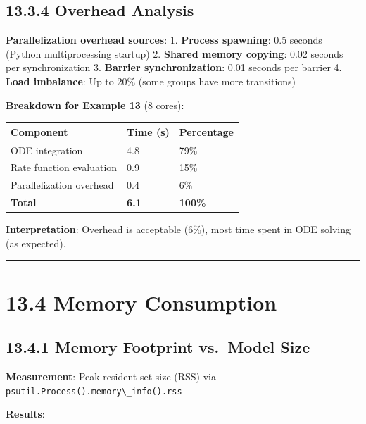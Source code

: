 \hypertarget{overhead-analysis}{%
\subsection{13.3.4 Overhead Analysis}\label{overhead-analysis}}

\textbf{Parallelization overhead sources}: 1. \textbf{Process spawning}:
0.5 seconds (Python multiprocessing startup) 2. \textbf{Shared memory
copying}: 0.02 seconds per synchronization 3. \textbf{Barrier
synchronization}: 0.01 seconds per barrier 4. \textbf{Load imbalance}:
Up to 20\% (some groups have more transitions)

\textbf{Breakdown for Example 13} (8 cores):

\begin{longtable}[]{@{}lll@{}}
\toprule\noalign{}
Component & Time (s) & Percentage \\
\midrule\noalign{}
\endhead
\bottomrule\noalign{}
\endlastfoot
ODE integration & 4.8 & 79\% \\
Rate function evaluation & 0.9 & 15\% \\
Parallelization overhead & 0.4 & 6\% \\
\textbf{Total} & \textbf{6.1} & \textbf{100\%} \\
\end{longtable}

\textbf{Interpretation}: Overhead is acceptable (6\%), most time spent
in ODE solving (as expected).

\begin{center}\rule{0.5\linewidth}{0.5pt}\end{center}

\hypertarget{memory-consumption}{%
\section{13.4 Memory Consumption}\label{memory-consumption}}

\hypertarget{memory-footprint-vs.-model-size}{%
\subsection{13.4.1 Memory Footprint vs.~Model
Size}\label{memory-footprint-vs.-model-size}}

\textbf{Measurement}: Peak resident set size (RSS) via
\passthrough{\lstinline!psutil.Process().memory\_info().rss!}

\textbf{Results}:

